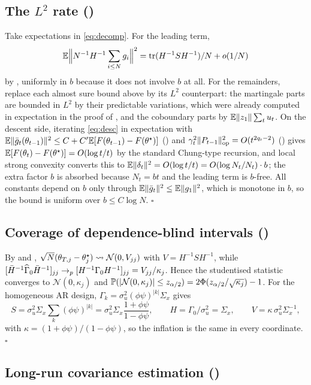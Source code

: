 \subsection{The $L^2$ rate (\texorpdfstring{}{Theorem})}

Take expectations in \eqref{eq:decomp}. For the leading term,
\[
\mathbb{E}\Big\|N^{-1}H^{-1}\sum_{i\le N}g_i\Big\|^2=\operatorname{tr}(H^{-1}SH^{-1})/N+o(1/N)
\]
by , uniformly in $b$ because it does not involve $b$ at all. For the
remainders, replace each almost sure bound above by its $L^2$ counterpart: the martingale
parts are bounded in $L^2$ by their predictable variations, which were already computed in
expectation in the proof of , and the coboundary parts by
$\mathbb{E}\lVert z_1 \rVert\sum_tu_t$. On the descent side, iterating \eqref{eq:desc} in expectation with
$\mathbb{E}\lVert \bar{g}_t(\theta_{t-1}) \rVert^2\le C+C'\mathbb{E}[F(\theta_{t-1})-F(\theta^\star)]$ () and
$\gamma_t^2\lVert P_{t-1} \rVert_{\mathrm{op}}^2=O(t^{2q_{\mathrm r}-2})$ () gives
$\mathbb{E}[F(\theta_t)-F(\theta^\star)]=O(\log t/t)$ by the standard Chung-type recursion, and local strong
convexity converts this to $\mathbb{E}\lVert \delta_t \rVert^2=O(\log t/t)=O(\log N_t/N_t)\cdot b$; the extra
factor $b$ is absorbed because $N_t=bt$ and the leading term is $b$-free. All constants depend
on $b$ only through $\mathbb{E}\lVert \bar{g}_t \rVert^2\le\mathbb{E}\lVert g_1 \rVert^2$, which is monotone in $b$, so the
bound is uniform over $b\le C\log N$. \hfill$\square$

\subsection{Coverage of dependence-blind intervals (\texorpdfstring{}{Proposition})}

By  and ,
$\sqrt N(\theta_{T,j}-\theta^\star_j)\rightsquigarrow\mathcal N(0,V_{jj})$ with
$V=H^{-1}SH^{-1}$, while
$[\bar{H}^{-1}\widehat{\Gamma}_0\bar{H}^{-1}]_{jj}\to_p[H^{-1}\Gamma_0H^{-1}]_{jj}=V_{jj}/\kappa_j$. Hence the
studentised statistic converges to $\mathcal N(0,\kappa_j)$ and
$\mathbb{P}(|\mathcal N(0,\kappa_j)|\le z_{\alpha/2})=2\Phi(z_{\alpha/2}/\sqrt{\kappa_j})-1$.
For the homogeneous AR design, $\Gamma_k=\sigma_u^2(\phi\psi)^{|k|}\Sigma_x$ gives
\[
S=\sigma_u^2\Sigma_x\sum_k(\phi\psi)^{|k|}=\sigma_u^2\Sigma_x\frac{1+\phi\psi}{1-\phi\psi},
\qquad H=\Gamma_0/\sigma_u^2=\Sigma_x,
\qquad V=\kappa\,\sigma_u^2\Sigma_x^{-1},
\]
with $\kappa=(1+\phi\psi)/(1-\phi\psi)$, so the inflation is the same in every coordinate. \hfill$\square$

\subsection{Long-run covariance estimation (\texorpdfstring{}{Theorem})}

